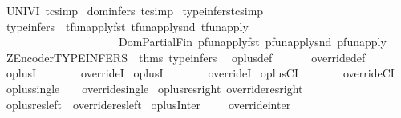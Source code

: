 \begin{isabellebody}
\isanewline
{}\isamarkupfalse%
\ UNIV{\isacharunderscore}I\ {\isacharbrackleft}tc{\isacharunderscore}simp{\isacharbrackright}\isanewline
{}\isamarkupfalse%
\ dom{\isacharunderscore}infers\ {\isacharbrackleft}tc{\isacharunderscore}simp{\isacharbrackright}\isanewline
{}\isamarkupfalse%
\ type{\isacharunderscore}infers{\isacharbrackleft}tc{\isacharunderscore}simp{\isacharbrackright}\isanewline
\isanewline
\isanewline
{}\isamarkupfalse%
\ type{\isacharunderscore}infers\ {\isacharequal}\ tfun{\isacharunderscore}apply{\isacharunderscore}fst\ tfun{\isacharunderscore}apply{\isacharunderscore}snd\ tfun{\isacharunderscore}apply\ \isanewline
\ \ \ \ \ \ \ \ \ \ \ \ \ \ \ \ \ \ \ \ \ Dom{\isacharunderscore}Partial{\isacharunderscore}Fin\ pfun{\isacharunderscore}apply{\isacharunderscore}fst\ pfun{\isacharunderscore}apply{\isacharunderscore}snd\ pfun{\isacharunderscore}apply\isanewline
\isanewline
%
\isadelimML
\isanewline
%
\endisadelimML
%
\isatagML
{}\isamarkupfalse%
{\isacharverbatimopen}\ ZEncoder{\isachardot}TYPE{\isacharunderscore}INFERS\ {\isacharcolon}{\isacharequal}\ {\isacharparenleft}thms\ {\isachardoublequote}type{\isacharunderscore}infers{\isachardoublequote}{\isacharparenright}\ {\isacharverbatimclose}%
\endisatagML
{\isafoldML}%
%
\isadelimML
%
\endisadelimML
%
\isamarkuptrue%
\isamarkupfalse%
\ oplus{\isacharunderscore}def\ \ \ \ \ \ {\isacharequal}\ override{\isacharunderscore}def\isanewline
{}\isamarkupfalse%
\ oplus{\isacharunderscore}I{}\ \ \ \ \ \ \ {\isacharequal}\ overrideI{}\isanewline
{}\isamarkupfalse%
\ oplus{\isacharunderscore}I{}\ \ \ \ \ \ \ {\isacharequal}\ overrideI{}\isanewline
{}\isamarkupfalse%
\ oplus{\isacharunderscore}CI\ \ \ \ \ \ \ {\isacharequal}\ overrideCI\isanewline
{}\isamarkupfalse%
\ oplus{\isacharunderscore}single\ \ \ {\isacharequal}\ override{\isacharunderscore}single\isanewline
{}\isamarkupfalse%
\ oplus{\isacharunderscore}res{\isacharunderscore}right{\isacharequal}\ override{\isacharunderscore}res{\isacharunderscore}right\isanewline
{}\isamarkupfalse%
\ oplus{\isacharunderscore}res{\isacharunderscore}left\ {\isacharequal}\ override{\isacharunderscore}res{\isacharunderscore}left\isanewline
{}\isamarkupfalse%
\ oplus{\isacharunderscore}Inter\ \ \ \ {\isacharequal}\ override{\isacharunderscore}inter\isanewline
{}\isamarkupfalse%

\end{isabellebody}
